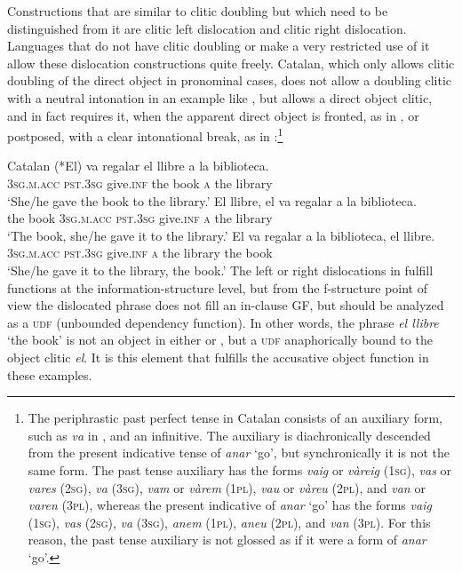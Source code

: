 \documentclass[output=paper,hidelinks]{langscibook}
\begin{document}
Constructions that are similar to clitic doubling but which need to be distinguished from it are clitic left dislocation and clitic right dislocation. Languages that do not have clitic doubling or make a very restricted use of it allow these dislocation constructions quite freely. Catalan, which only allows clitic doubling of the direct object in pronominal cases, does not allow a doubling clitic with a neutral intonation in an example like , but allows a direct object clitic, and in fact requires it, when the apparent direct object is fronted, as in , or postposed, with a clear intonational break, as in :\footnote{The periphrastic past perfect tense in Catalan consists of an auxiliary form, such as \textit{va} in , and an infinitive. The auxiliary is diachronically descended from the present indicative tense of \textit{anar} `go', but synchronically it is not the same form. The past tense auxiliary has the forms \textit{vaig} or \textit{vàreig} (1\textsc{sg}), \textit{vas} or \textit{vares} (\textsc{2sg}), \textit{va} (\textsc{3sg}), \textit{vam} or \textit{vàrem} (\textsc{1pl}), \textit{vau} or \textit{vàreu} (\textsc{2pl}), and \textit{van} or \textit{varen} (\textsc{3pl}), whereas the present indicative of \textit{anar} `go' has the forms \textit{vaig} (\textsc{1sg}), \textit{vas} (\textsc{2sg}), \textit{va} (\textsc{3sg}), \textit{anem} (\textsc{1pl}), \textit{aneu} (\textsc{2pl}), and \textit{van} (\textsc{3pl}). For this reason, the past tense auxiliary is not glossed as if it were a form of \textit{anar} `go'.}

\ea\label{ex:Romance:15} Catalan \citep[1233--1237]{Vallduvi2002}
\ea\label{ex:Romance:15a}
\gll
(*El) va regalar el llibre a la biblioteca.\\
\textsc{3sg.m.acc} \textsc{pst.3sg} give.\textsc{inf} the book \textsc{a} the library\\
\glt   `She/he gave the book to the library.'
\ex\label{ex:Romance:15b}
\gll
El llibre, el va regalar a la biblioteca.\\
the book \textsc{3sg.m.acc} \textsc{pst.3sg} give.\textsc{inf} \textsc{a} the library\\
\glt   `The book, she/he gave it to the library.'
\ex\label{ex:Romance:15c}
\gll
El va regalar a la biblioteca, el llibre.\\
\textsc{3sg.m.acc} \textsc{pst.3sg} give.\textsc{inf} \textsc{a} the library the book\\
\glt  `She/he gave it to the library, the book.'
\z\z
The left or right dislocations in  fulfill functions at the information-structure level, but from the f-structure point of view the dislocated phrase does not fill an in-clause GF, but should be analyzed as a \textsc{udf} (unbounded dependency function). In other words, the phrase \textit{el llibre} `the book' is not an object in either  or , but a \textsc{udf} anaphorically bound to the object clitic \textit{el}. It is this element that fulfills the accusative object function in these examples.
\end{document}
